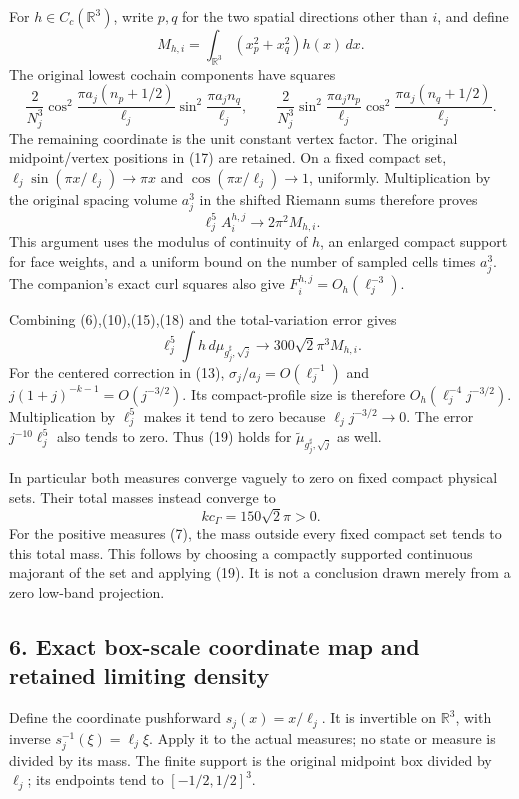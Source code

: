 \documentclass[
  11pt,
]{article}
\begin{document}
For \(h\in C_c(\mathbb R^3)\), write \(p,q\) for the two spatial
directions other than \(i\), and define \[
 M_{h,i}=\int_{\mathbb R^3}(x_p^2+x_q^2)h(x)\,dx .
 \tag{16}
\] The original lowest cochain components have squares \[
 \frac2{N_j^3}
 \cos^2\frac{\pi a_j(n_p+1/2)}{\ell_j}
 \sin^2\frac{\pi a_j n_q}{\ell_j},\qquad
 \frac2{N_j^3}
 \sin^2\frac{\pi a_j n_p}{\ell_j}
 \cos^2\frac{\pi a_j(n_q+1/2)}{\ell_j}.
 \tag{17}
\] The remaining coordinate is the unit constant vertex factor. The
original midpoint/vertex positions in (17) are retained. On a fixed
compact set, \(\ell_j\sin(\pi x/\ell_j)\to\pi x\) and
\(\cos(\pi x/\ell_j)\to1\), uniformly. Multiplication by the original
spacing volume \(a_j^3\) in the shifted Riemann sums therefore proves \[
 \ell_j^5 A_i^{h,j}\longrightarrow2\pi^2M_{h,i}.
 \tag{18}
\] This argument uses the modulus of continuity of \(h\), an enlarged
compact support for face weights, and a uniform bound on the number of
sampled cells times \(a_j^3\). The companion's exact curl squares also
give \(F_i^{h,j}=O_h(\ell_j^{-3})\).

Combining (6),(10),(15),(18) and the total-variation error gives \[
 \boxed{\ell_j^5\int h\,d\mu_{g_j^\sharp,\sqrt j}
             \longrightarrow300\sqrt2\pi^3M_{h,i}.}
 \tag{19}
\] For the centered correction in (13), \(\sigma_j/a_j=O(\ell_j^{-1})\)
and \(j(1+j)^{-k-1}=O(j^{-3/2})\). Its compact-profile size is therefore
\(O_h(\ell_j^{-4}j^{-3/2})\). Multiplication by \(\ell_j^5\) makes it
tend to zero because \(\ell_j j^{-3/2}\to0\). The error
\(j^{-10}\ell_j^5\) also tends to zero. Thus (19) holds for
\(\widetilde\mu_{g_j^\sharp,\sqrt j}\) as well.

In particular both measures converge vaguely to zero on fixed compact
physical sets. Their total masses instead converge to \[
 kc_\Gamma=150\sqrt2\pi>0 .
 \tag{20}
\] For the positive measures (7), the mass outside every fixed compact
set tends to this total mass. This follows by choosing a compactly
supported continuous majorant of the set and applying (19). It is not a
conclusion drawn merely from a zero low-band projection.

\subsection{6. Exact box-scale coordinate map and retained limiting
density}\label{weak-coupling-part-12-exact-box-scale-coordinate-map-and-retained-limiting-density}

Define the coordinate pushforward \(s_j(x)=x/\ell_j\). It is invertible
on \(\mathbb R^3\), with inverse \(s_j^{-1}(\xi)=\ell_j\xi\). Apply it
to the actual measures; no state or measure is divided by its mass. The
finite support is the original midpoint box divided by \(\ell_j\); its
endpoints tend to \([-1/2,1/2]^3\).
\end{document}
